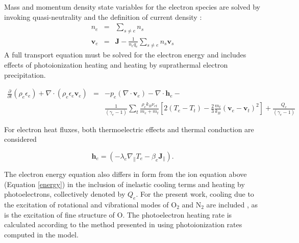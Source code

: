 \documentclass[11pt,letterpaper]{article}
\begin{document}
Mass and momentum density state variables for the electron species are solved by invoking quasi-neutrality and the definition of current density \citep[cf. also][equations 25 and 26]{Zettergren:2012}:
\begin{eqnarray}
n_e &=& \sum_{s \ne e} n_s \label{eqn:quasineu} \\
\mathbf{v}_e &=& \mathbf{J} - \frac{1}{n_e q_e} \sum_{s \ne e} n_s \mathbf{v}_s
\end{eqnarray}
A full transport equation must be solved for the electron energy and includes effects of photoionization heating and heating by suprathermal electron precipitation. 
\begin{linenomath*} \begin{eqnarray}
\frac{\partial}{\partial t} \left( \rho_e \epsilon_e \right) + \nabla \cdot \left( \rho_e \epsilon_e \mathbf{v}_e \right) &=& - p_e (\nabla \cdot \mathbf{v}_e) - \nabla \cdot \mathbf{h}_e - \\
\nonumber&& \frac{1}{(\gamma_e - 1 )}\sum_t \frac{\rho_e k_B \nu_{et}}{m_e + m_t}\left[ 2 (T_e-T_t) - \frac{2}{3} \frac{m_t}{k_B}(\mathbf{v}_e-\mathbf{v}_t)^2 \right] + \frac{Q_e}{(\gamma_e - 1 )}\label{energye}
\end{eqnarray} \end{linenomath*}
For electron heat fluxes, both thermoelectric effects \citep{Schunk:1978} and thermal conduction are considered \citep{Banks:1973,Huba:2000}
\begin{linenomath*} \begin{equation}
\mathbf{h}_e = \left( - \lambda_e \nabla_{\parallel} T_e - \beta_e \mathbf{J}_{\parallel} \right).
\end{equation} \end{linenomath*}
The electron energy equation also differs in form from the ion equation above (Equation \ref{energy}) in the inclusion of inelastic cooling terms and heating by photoelectrons, collectively denoted by $Q_e$. For the present work, cooling due to the excitation of rotational and vibrational modes of O$_2$ and N$_2$ are included \citep{Schunk:2009}, as is the excitation of fine structure of O. The photoelectron heating rate is calculated according to the method presented in \citet{Swartz:1972} using photoionization rates computed in the model.

\end{document}
